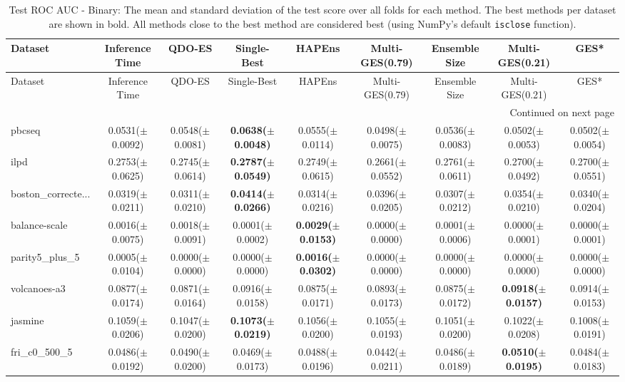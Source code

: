 \begin{longtable}{lcccccccc}
\caption{Test ROC AUC - Binary: The mean and standard deviation of the test score over all folds for each method. The best methods per dataset are shown in bold. All methods close to the best method are considered best (using NumPy’s default \texttt{isclose} function).}
\label{tab:results} \\ 
\toprule
Dataset & Inference Time & QDO-ES & Single-Best & HAPEns & Multi-GES(0.79) & Ensemble Size & Multi-GES(0.21) & GES* \\
\midrule
\endfirsthead
\toprule
Dataset & Inference Time & QDO-ES & Single-Best & HAPEns & Multi-GES(0.79) & Ensemble Size & Multi-GES(0.21) & GES* \\
\midrule
\endhead
\midrule
\multicolumn{9}{r}{Continued on next page} \\
\midrule
\endfoot
\bottomrule
\endlastfoot
pbcseq & 0.0531($\pm$0.0092) & 0.0548($\pm$0.0081) & \textbf{0.0638($\pm$0.0048)} & 0.0555($\pm$0.0114) & 0.0498($\pm$0.0075) & 0.0536($\pm$0.0083) & 0.0502($\pm$0.0053) & 0.0502($\pm$0.0054) \\
ilpd & 0.2753($\pm$0.0625) & 0.2745($\pm$0.0614) & \textbf{0.2787($\pm$0.0549)} & 0.2749($\pm$0.0615) & 0.2661($\pm$0.0552) & 0.2761($\pm$0.0611) & 0.2700($\pm$0.0492) & 0.2700($\pm$0.0551) \\
boston\_correcte... & 0.0319($\pm$0.0211) & 0.0311($\pm$0.0210) & \textbf{0.0414($\pm$0.0266)} & 0.0314($\pm$0.0216) & 0.0396($\pm$0.0205) & 0.0307($\pm$0.0212) & 0.0354($\pm$0.0210) & 0.0340($\pm$0.0204) \\
balance-scale & 0.0016($\pm$0.0075) & 0.0018($\pm$0.0091) & 0.0001($\pm$0.0002) & \textbf{0.0029($\pm$0.0153)} & 0.0000($\pm$0.0000) & 0.0001($\pm$0.0006) & 0.0000($\pm$0.0001) & 0.0000($\pm$0.0001) \\
parity5\_plus\_5 & 0.0005($\pm$0.0104) & 0.0000($\pm$0.0000) & 0.0000($\pm$0.0000) & \textbf{0.0016($\pm$0.0302)} & 0.0000($\pm$0.0000) & 0.0000($\pm$0.0000) & 0.0000($\pm$0.0000) & 0.0000($\pm$0.0000) \\
volcanoes-a3 & 0.0877($\pm$0.0174) & 0.0871($\pm$0.0164) & 0.0916($\pm$0.0158) & 0.0875($\pm$0.0171) & 0.0893($\pm$0.0173) & 0.0875($\pm$0.0172) & \textbf{0.0918($\pm$0.0157)} & 0.0914($\pm$0.0153) \\
jasmine & 0.1059($\pm$0.0206) & 0.1047($\pm$0.0200) & \textbf{0.1073($\pm$0.0219)} & 0.1056($\pm$0.0200) & 0.1055($\pm$0.0193) & 0.1051($\pm$0.0200) & 0.1022($\pm$0.0208) & 0.1008($\pm$0.0191) \\
fri\_c0\_500\_5 & 0.0486($\pm$0.0192) & 0.0490($\pm$0.0200) & 0.0469($\pm$0.0173) & 0.0488($\pm$0.0196) & 0.0442($\pm$0.0211) & 0.0486($\pm$0.0189) & \textbf{0.0510($\pm$0.0195)} & 0.0484($\pm$0.0183) \\

\end{longtable}
